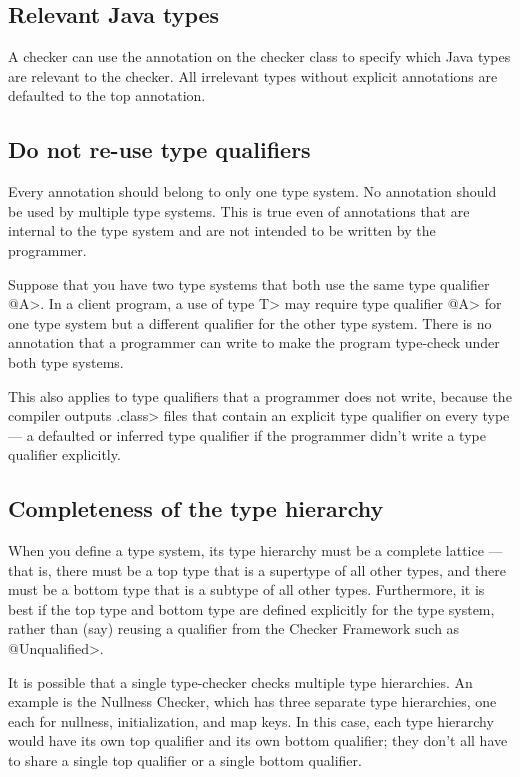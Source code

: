 \subsection{Relevant Java types\label{creating-relevant-java-types}}

A checker can use the 
annotation on the checker class to specify which Java types are relevant to the
checker.  All irrelevant types without explicit annotations are defaulted to
the top annotation.


\subsection{Do not re-use type qualifiers\label{creating-do-not-re-use-type-qualifiers}}

Every annotation should belong to only one type system.  No annotation
should be used by multiple type systems.  This is true even of annotations
that are internal to the type system and are not intended to be written by
the programmer.

Suppose that you have two type systems that both use the same type
qualifier \<@A>.  In a client program, a use of type \<T> may require type
qualifier \<@A> for one type system but a different qualifier for the other
type system.  There is no annotation that a programmer can write to make
the program type-check under both type systems.

This also applies to type qualifiers that a programmer does not write,
because the compiler outputs \<.class> files that contain an explicit type
qualifier on every type --- a defaulted or inferred type qualifier if the
programmer didn't write a type qualifier explicitly.


\subsection{Completeness of the type hierarchy\label{creating-bottom-and-top-qualifier}}

When you define a type system, its type hierarchy must be a
complete lattice --- that is, there must be a top type that is a
supertype of all other types, and there must be a bottom type that is a
subtype of all other types.
Furthermore, it is best if the top type and bottom type are defined
explicitly for the type system, rather than (say) reusing a qualifier from the
Checker Framework such as \<@Unqualified>.

It is possible that a single type-checker checks multiple type hierarchies.
An example is the Nullness Checker, which has three separate type
hierarchies, one each for
nullness, initialization, and map keys.  In this case, each type hierarchy
would have its own top qualifier and its own bottom qualifier; they don't
all have to share a single top qualifier or a single bottom qualifier.


